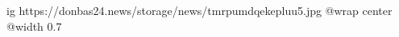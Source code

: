  
 
 
 
 

\ifcmt
  ig https://donbas24.news/storage/news/tmrpumdqekepluu5.jpg
  @wrap center
  @width 0.7
\fi
